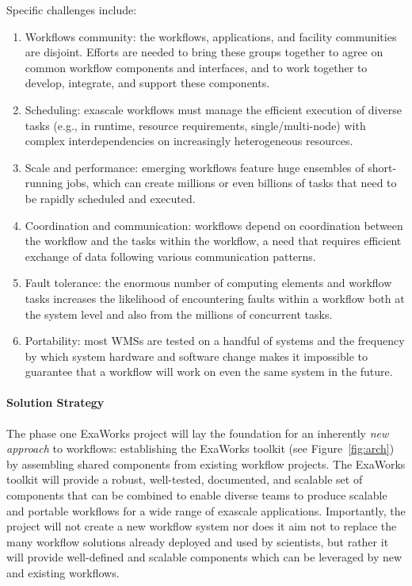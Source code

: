 Specific challenges include: 
\begin{enumerate}
    \item Workflows community: the workflows, applications, and facility communities are disjoint. Efforts are needed to bring these groups together to agree on common workflow components and interfaces, and to work together to develop, integrate, and support these components.
    \item Scheduling: exascale workflows must manage the efficient execution of diverse
    tasks (e.g., in runtime, resource requirements, single/multi-node) with complex interdependencies on increasingly heterogeneous resources. 
    \item Scale and performance: emerging workflows feature huge ensembles of short-running jobs, which can create millions or even billions of tasks that need to be rapidly scheduled and executed.
    \item Coordination and communication: workflows depend on coordination between the workflow and the tasks within the workflow, a need that requires efficient exchange of data following various communication patterns.
    \item Fault tolerance: the enormous number of computing elements and workflow tasks increases the likelihood of encountering faults within a workflow both at the system level and also from the millions of concurrent tasks. 
    \item Portability: most WMSs are tested on a handful of systems and the frequency by which system hardware and software change makes it impossible to guarantee that a workflow will work on even the same system in the future.
\end{enumerate}

\paragraph{Solution Strategy}
The phase one ExaWorks project will lay the foundation for 
an inherently \textit{new approach} to workflows: establishing the ExaWorks toolkit 
(see Figure~\ref{fig:arch}) by assembling shared components from existing workflow projects. 
The ExaWorks toolkit will provide a robust, well-tested, documented, and scalable set of components 
that can be combined to enable diverse teams to produce scalable and portable workflows for a wide range of exascale applications.  
Importantly, the project will not create a new workflow system nor does
it aim not to replace the many workflow solutions already deployed and used by scientists, 
but rather it will provide well-defined and scalable components which can be leveraged by new and existing workflows.


